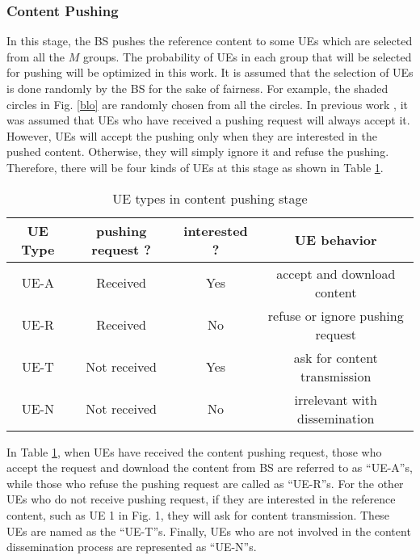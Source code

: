 \documentclass[12pt, draftclsnofoot, onecolumn]{IEEEtran}
\begin{document}
\subsubsection{Content Pushing}

In this stage, the BS pushes the reference content to some UEs which are selected from all the $M$ groups. The probability of UEs in each group that will be selected for pushing will be optimized in this work. It is assumed that the selection of UEs is done randomly by the BS for the sake of fairness. For example, the shaded circles in Fig. \ref{blo} are randomly chosen from all the circles.
In previous work \cite{al2014optimal, YWuEnergy2016, li2014multiple, 6928487, zhao2015social, wang2015social, guo2015cooperative}, it was assumed that UEs who have received a pushing request will always accept it. However, UEs will accept the pushing only when they are interested in the pushed content. Otherwise, they will simply ignore it and refuse the pushing. Therefore, there will be four kinds of UEs at this stage as shown in Table \ref{table state}.

\begin{table}[H]
\centering
\caption{UE types in content pushing stage}
\label{table state}
\begin{tabular}{c|c|c|c}\hline
UE Type & pushing request ? & interested ? & UE behavior \\
\hline
UE-A & Received & Yes &accept and download content \\
\hline
UE-R & Received & No &refuse or ignore pushing request \\
\hline
UE-T & Not received & Yes & ask for content transmission \\
\hline
UE-N & Not received & No & irrelevant with dissemination\\ \hline
\end{tabular}
\end{table}

In Table \ref{table state}, when UEs have received the content pushing request, those who accept the request and download the content from BS are referred to as “UE-A”s,
while those who refuse the pushing request are called as “UE-R”s.
For the other UEs who do not receive pushing request, if they are interested in the reference content, such as UE 1 in Fig. 1, they will ask for content transmission.
These UEs are named as the “UE-T”s.
Finally, UEs who are not involved in the content dissemination process are represented as “UE-N”s.
\end{document}
